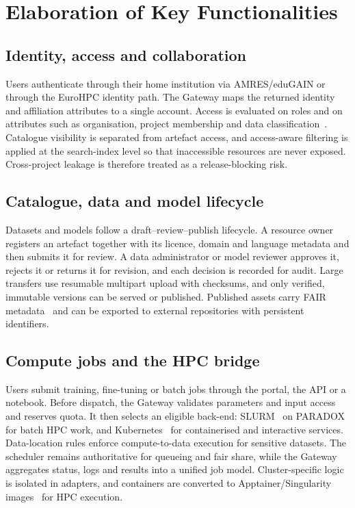 \documentclass[conference,a4paper]{IEEEtran}
\begin{document}
\section{Elaboration of Key Functionalities}

\subsection{Identity, access and collaboration}
Users authenticate through their home institution via AMRES/eduGAIN or through the EuroHPC identity path. The Gateway maps the returned identity and affiliation attributes to a single account. Access is evaluated on roles and on attributes such as organisation, project membership and data classification~\cite{nist_abac}. Catalogue visibility is separated from artefact access, and access-aware filtering is applied at the search-index level so that inaccessible resources are never exposed. Cross-project leakage is therefore treated as a release-blocking risk.

\subsection{Catalogue, data and model lifecycle}
Datasets and models follow a draft--review--publish lifecycle. A resource owner registers an artefact together with its licence, domain and language metadata and then submits it for review. A data administrator or model reviewer approves it, rejects it or returns it for revision, and each decision is recorded for audit. Large transfers use resumable multipart upload with checksums, and only verified, immutable versions can be served or published. Published assets carry FAIR metadata~\cite{wilkinson2016fair} and can be exported to external repositories with persistent identifiers.

\subsection{Compute jobs and the HPC bridge}
Users submit training, fine-tuning or batch jobs through the portal, the API or a notebook. Before dispatch, the Gateway validates parameters and input access and reserves quota. It then selects an eligible back-end: SLURM~\cite{yoo2003slurm} on PARADOX for batch HPC work, and Kubernetes~\cite{burns2016borg} for containerised and interactive services. Data-location rules enforce compute-to-data execution for sensitive datasets. The scheduler remains authoritative for queueing and fair share, while the Gateway aggregates status, logs and results into a unified job model. Cluster-specific logic is isolated in adapters, and containers are converted to Apptainer/Singularity images~\cite{kurtzer2017singularity} for HPC execution.
\end{document}
